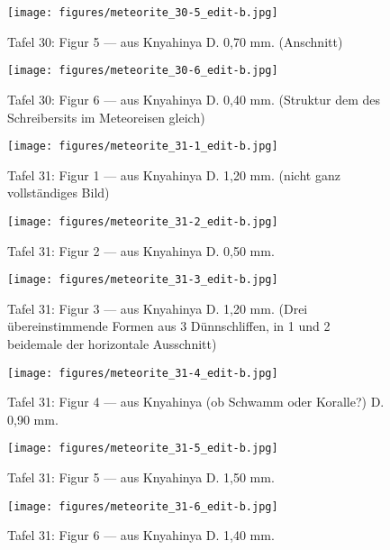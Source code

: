 \documentclass[a4paper, 12pt, oneside]{article}
\begin{document}
\clearpage
\begin{figure}[t]
\texttt{[image: figures/meteorite\_30-5\_edit-b.jpg]}
\caption{Tafel 30: Figur 5 --- aus Knyahinya D. 0,70 mm. (Anschnitt)}
\centering
\end{figure}
\clearpage
\begin{figure}[t]
\texttt{[image: figures/meteorite\_30-6\_edit-b.jpg]}
\caption{Tafel 30: Figur 6 --- aus Knyahinya D. 0,40 mm. (Struktur dem des Schreibersits im Meteoreisen gleich)}
\centering
\end{figure}
\clearpage
{}
\begin{figure}[t]
\texttt{[image: figures/meteorite\_31-1\_edit-b.jpg]}
\caption{Tafel 31: Figur 1 --- aus Knyahinya D. 1,20 mm. (nicht ganz vollständiges Bild)}
\centering
\end{figure}
\clearpage
\begin{figure}[t]
\texttt{[image: figures/meteorite\_31-2\_edit-b.jpg]}
\caption{Tafel 31: Figur 2 --- aus Knyahinya D. 0,50 mm.}
\centering
\end{figure}
\clearpage
\begin{figure}[t]
\texttt{[image: figures/meteorite\_31-3\_edit-b.jpg]}
\caption{Tafel 31: Figur 3 --- aus Knyahinya D. 1,20 mm. (Drei übereinstimmende Formen aus 3 Dünnschliffen, in 1 und 2 beidemale der horizontale Ausschnitt)}
\centering
\end{figure}
\clearpage
\begin{figure}[t]
\texttt{[image: figures/meteorite\_31-4\_edit-b.jpg]}
\caption{Tafel 31: Figur 4 --- aus Knyahinya (ob Schwamm oder Koralle?) D. 0,90 mm.}
\centering
\end{figure}
\clearpage
\begin{figure}[t]
\texttt{[image: figures/meteorite\_31-5\_edit-b.jpg]}
\caption{Tafel 31: Figur 5 --- aus Knyahinya D. 1,50 mm.}
\centering
\end{figure}
\clearpage
\begin{figure}[t]
\texttt{[image: figures/meteorite\_31-6\_edit-b.jpg]}
\caption{Tafel 31: Figur 6 --- aus Knyahinya D. 1,40 mm.}
\centering
\end{figure}
\end{document}
